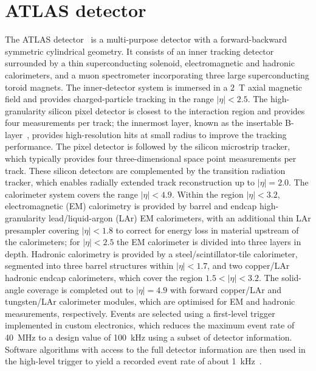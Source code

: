 \documentclass[cernpreprint,texlive=2016,txfonts,UKenglish]{latex/atlasdoc}
\begin{document}
\section{ATLAS detector}
\label{detector}
The ATLAS detector~\cite{PERF-2007-01} is a multi-purpose detector
with a forward-backward symmetric cylindrical geometry. It consists of
an inner tracking detector surrounded by a thin superconducting
solenoid, electromagnetic and hadronic calorimeters, and a muon
spectrometer incorporating three large superconducting toroid
magnets. The inner-detector system is immersed in a $2$~T axial
magnetic field and provides charged-particle tracking in the range
$|\eta|<2.5$. The high-granularity silicon pixel detector is closest
to the interaction region and provides four measurements per track;
the innermost layer, known as the insertable
B-layer~\cite{ATLAS-TDR-19}, provides high-resolution hits at small
radius to improve the tracking performance. The pixel detector is
followed by the silicon microstrip tracker, which typically provides
four three-dimensional space point measurements per track. These
silicon detectors are complemented by the transition radiation
tracker, which enables radially extended track reconstruction up to
$|\eta|=2.0$. The calorimeter system covers the range
$|\eta|<4.9$. Within the region $|\eta|<3.2$, electromagnetic (EM)
calorimetry is provided by barrel and endcap high-granularity
lead/liquid-argon (LAr) EM calorimeters, with an additional thin LAr
presampler covering $|\eta|<1.8$ to correct for energy loss in
material upstream of the calorimeters; for $|\eta|<2.5$ the EM
calorimeter is divided into three layers in depth. Hadronic
calorimetry is provided by a steel/scintillator-tile calorimeter,
segmented into three barrel structures within $|\eta|<1.7$, and two
copper/LAr hadronic endcap calorimeters, which cover the region
$1.5<|\eta|<3.2$. The solid-angle coverage is completed out to
$|\eta|=4.9$ with forward copper/LAr and tungsten/LAr calorimeter
modules, which are optimised for EM and hadronic measurements,
respectively. Events are selected using a first-level trigger
implemented in custom electronics, which reduces the maximum event
rate of 40~MHz to a design value of 100~kHz using a subset of detector
information. Software algorithms with access to the full detector
information are then used in the high-level trigger to yield a
recorded event rate of about 1~kHz~\cite{epj:c77:317}.
\end{document}
